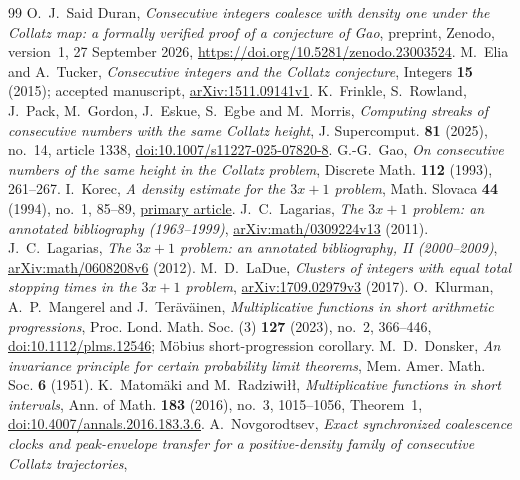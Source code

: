 \documentclass[11pt]{amsart}
\theoremstyle{definition}
\theoremstyle{remark}
\begin{document}
\begin{thebibliography}{99}
O.~J.~Said Duran, \emph{Consecutive integers coalesce with density one under the Collatz map: a formally verified proof of a conjecture of Gao},
preprint, Zenodo, version~1, 27 September 2026,
\url{https://doi.org/10.5281/zenodo.23003524}.
M.~Elia and A.~Tucker, \emph{Consecutive integers and the Collatz conjecture},
Integers \textbf{15} (2015); accepted manuscript,
\href{https://arxiv.org/abs/1511.09141v1}{arXiv:1511.09141v1}.
K.~Frinkle, S.~Rowland, J.~Pack, M.~Gordon, J.~Eskue, S.~Egbe and M.~Morris, \emph{Computing streaks of consecutive numbers with the same Collatz height},
J. Supercomput. \textbf{81} (2025), no.~14, article 1338,
\href{https://doi.org/10.1007/s11227-025-07820-8}{doi:10.1007/s11227-025-07820-8}.
G.-G.~Gao, \emph{On consecutive numbers of the same height in the Collatz problem},
Discrete Math. \textbf{112} (1993), 261--267.
I.~Korec, \emph{A density estimate for the $3x+1$ problem},
Math. Slovaca \textbf{44} (1994), no.~1, 85--89,
\href{https://dml.cz/bitstream/handle/10338.dmlcz/133225/MathSlov_44-1994-1_8.pdf}{primary article}.
J.~C.~Lagarias, \emph{The $3x+1$ problem: an annotated bibliography (1963--1999)},
\href{https://arxiv.org/abs/math/0309224v13}{arXiv:math/0309224v13} (2011).
J.~C.~Lagarias, \emph{The $3x+1$ problem: an annotated bibliography, II (2000--2009)},
\href{https://arxiv.org/abs/math/0608208v6}{arXiv:math/0608208v6} (2012).
M.~D.~LaDue, \emph{Clusters of integers with equal total stopping times in the $3x+1$ problem},
\href{https://arxiv.org/abs/1709.02979v3}{arXiv:1709.02979v3} (2017).
O.~Klurman, A.~P.~Mangerel and J.~Ter\"av\"ainen, \emph{Multiplicative functions in short arithmetic progressions},
Proc. Lond. Math. Soc. (3) \textbf{127} (2023), no.~2, 366--446,
\href{https://doi.org/10.1112/plms.12546}{doi:10.1112/plms.12546}; M\"obius short-progression corollary.
M.~D.~Donsker, \emph{An invariance principle for certain probability limit theorems},
Mem. Amer. Math. Soc. \textbf{6} (1951).
K.~Matom\"aki and M.~Radziwi\l\l, \emph{Multiplicative functions in short intervals},
Ann. of Math. \textbf{183} (2016), no.~3, 1015--1056, Theorem~1,
\href{https://doi.org/10.4007/annals.2016.183.3.6}{doi:10.4007/annals.2016.183.3.6}.
A.~Novgorodtsev, \emph{Exact synchronized coalescence clocks and peak-envelope transfer for a positive-density family of consecutive Collatz trajectories},

\end{thebibliography}
\end{document}
